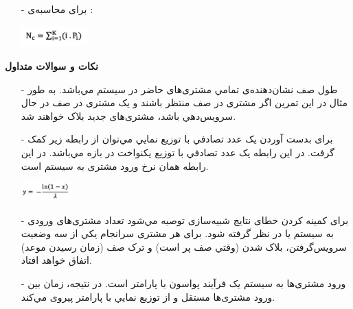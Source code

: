 \documentclass[12pt]{article}
\begin{document}
\begin{itemize}
\begin{center}
        \end{center}
    \item[-]
	برای محاسبه‌ی  :
	    \begin{center}
	        \raggedright
            \includegraphics[width=0.2\textwidth]{Content/2.6.png}
        \end{center}
	\end{itemize}
	
	\newpage
    \textbf{نکات و سوالات متداول}
    \begin{itemize}
	\item[-]
	طول صف نشان‌دهنده‌ی تمامي مشتری‌های حاضر در سیستم مي‌باشد. به طور مثال در این تمرین اگر  مشتری در صف
منتظر باشند و یک مشتری در صف در حال سرویس‌دهي باشد، مشتری‌های جدید بلاک خواهند شد. 
	\item[-]
برای بدست آوردن یک عدد تصادفي با توزیع نمایي مي‌توان از رابطه زیر کمک گرفت. در این رابطه  یک عدد تصادفي با
توزیع یکنواخت  در بازه \lr{$[0,1)$} مي‌باشد. در این رابطه \lr{$\lambda$} همان نرخ ورود مشتری به سیستم است. 
        \begin{center}
	        \raggedright
            \includegraphics[width=0.15\textwidth]{Content/2.7.png}
        \end{center}
    \item[-]
برای کمینه کردن خطای نتایج شبیه‌سازی توصیه مي‌شود تعداد مشتری‌های ورودی به سیستم  یا  در نظر گرفته
شود. برای هر مشتری سرانجام یکي از سه وضعیت سرویس‌گرفتن، بلاک شدن (وقتي صف پر است) و ترک صف (زمان  رسیدن موعد) اتفاق خواهد افتاد.
	\item[-]
ورود مشتری‌ها به سیستم یک فرآیند پواسون با پارامتر \lr{$\lambda$} است. در نتیجه، زمان بین ورود مشتری‌ها مستقل و از توزیع
نمایي با پارامتر \lr{$\lambda$} پیروی مي‌کند. 
	\end{itemize}
	
\end{document}

